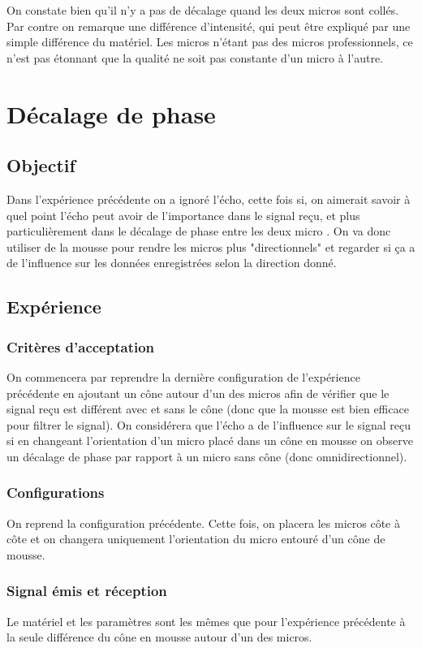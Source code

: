On constate bien qu'il n'y a pas de décalage quand les deux micros sont collés. Par contre on remarque une différence d'intensité, qui peut être expliqué par une simple différence du matériel. Les micros n'étant pas des micros professionnels, ce n'est pas étonnant que la qualité ne soit pas constante d'un micro à l'autre.


\chapter{Décalage de phase}
\section{Objectif}
Dans l'expérience précédente on a ignoré l'écho, cette fois si, on aimerait savoir à quel point l'écho peut avoir de l'importance dans le signal reçu, et plus particulièrement dans le décalage de phase entre les deux micro .
On va donc utiliser de la mousse pour rendre les micros plus "directionnels" et regarder si ça a de l'influence sur les données enregistrées selon la direction donné.

\section{Expérience}
\subsection{Critères d'acceptation}
On commencera par reprendre la dernière configuration de l'expérience précédente en ajoutant un cône autour d'un des micros afin de vérifier que le signal reçu est différent avec et sans le cône (donc que la mousse est bien efficace pour filtrer le signal).
On considérera que l'écho a de l'influence sur le signal reçu si en changeant l'orientation d'un micro placé dans un cône en mousse on observe un décalage de phase par rapport à un micro sans cône (donc omnidirectionnel).

\subsection{Configurations}
On reprend la configuration précédente. Cette fois, on placera les micros côte à côte et on changera uniquement l'orientation  du micro entouré d'un cône de mousse.

\subsection{Signal émis et réception}
Le matériel et les paramètres sont les mêmes que pour l'expérience précédente à la seule différence du cône en mousse autour d'un des micros.

